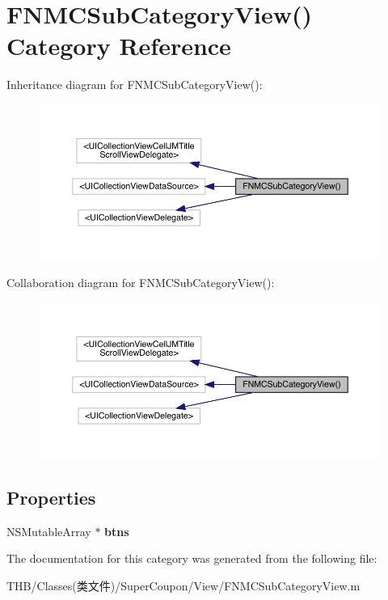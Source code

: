 \hypertarget{category_f_n_m_c_sub_category_view_07_08}{}\section{F\+N\+M\+C\+Sub\+Category\+View() Category Reference}
\label{category_f_n_m_c_sub_category_view_07_08}


Inheritance diagram for F\+N\+M\+C\+Sub\+Category\+View()\+:\nopagebreak
\begin{figure}[H]
\begin{center}
\leavevmode
\includegraphics[width=350pt]{category_f_n_m_c_sub_category_view_07_08__inherit__graph}
\end{center}
\end{figure}


Collaboration diagram for F\+N\+M\+C\+Sub\+Category\+View()\+:\nopagebreak
\begin{figure}[H]
\begin{center}
\leavevmode
\includegraphics[width=350pt]{category_f_n_m_c_sub_category_view_07_08__coll__graph}
\end{center}
\end{figure}
\subsection*{Properties}
\begin{DoxyCompactItemize}
\item 
\mbox{\label{category_f_n_m_c_sub_category_view_07_08_a65de6a6a17bb493870821aaae25e85c6}} 
N\+S\+Mutable\+Array $\ast$ {\bfseries btns}
\end{DoxyCompactItemize}


The documentation for this category was generated from the following file\+:\begin{DoxyCompactItemize}
\item 
T\+H\+B/\+Classes(类文件)/\+Super\+Coupon/\+View/F\+N\+M\+C\+Sub\+Category\+View.\+m\end{DoxyCompactItemize}
